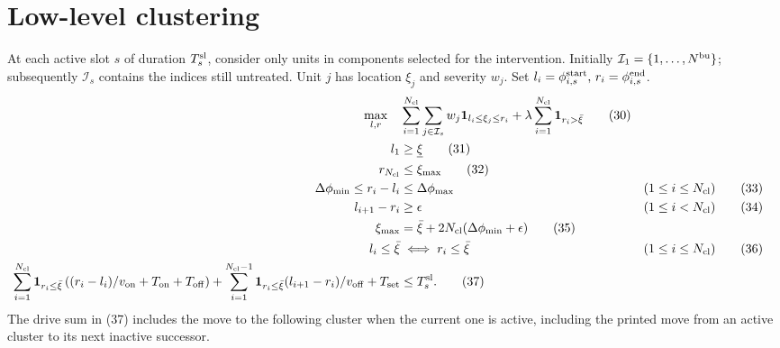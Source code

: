 \documentclass{article}
\begin{document}
\section*{Low-level clustering}
At each active slot \(s\) of duration \(T_s^{\rm sl}\), consider only units in components
selected for the intervention. Initially \(\mathcal I_1=\{1,\ldots,N^{\rm bu}\}\);
subsequently \(\mathcal I_s\) contains the indices still untreated. Unit \(j\) has
location \(\xi_j\) and severity \(w_j\). Set
\(l_i=\phi_{i,s}^{\rm start},\,r_i=\phi_{i,s}^{\rm end}\).
\begin{align}
\max_{l,r}\quad&
\sum_{i=1}^{N_{\rm cl}}\sum_{j\in\mathcal I_s}w_j{\bf1}_{l_i\le\xi_j\le r_i}
 +\lambda\sum_{i=1}^{N_{\rm cl}}{\bf1}_{r_i>\bar\xi}\tag{30}\\
l_1&\ge\underline\xi\tag{31}\\
r_{N_{\rm cl}}&\le\xi_{\max}\tag{32}\\
\Delta\phi_{\min}\le r_i-l_i&\le\Delta\phi_{\max} &&(1\le i\le N_{\rm cl})\tag{33}\\
l_{i+1}-r_i&\ge\epsilon &&(1\le i<N_{\rm cl})\tag{34}\\
\xi_{\max}&=\bar\xi+2N_{\rm cl}(\Delta\phi_{\min}+\epsilon)\tag{35}\\
l_i\le\bar\xi&\iff r_i\le\bar\xi &&(1\le i\le N_{\rm cl})\tag{36}\\
\sum_{i=1}^{N_{\rm cl}}{\bf1}_{r_i\le\bar\xi}
 \left((r_i-l_i)/v_{\rm on}+T_{\rm on}+T_{\rm off}\right)
 +\sum_{i=1}^{N_{\rm cl}-1}{\bf1}_{r_i\le\bar\xi}
 (l_{i+1}-r_i)/v_{\rm off}+T_{\rm set}&\le T_s^{\rm sl}.\tag{37}
\end{align}
The drive sum in (37) includes the move to the following cluster when the current one is active,
including the printed move from an active cluster to its next inactive successor.
\end{document}
